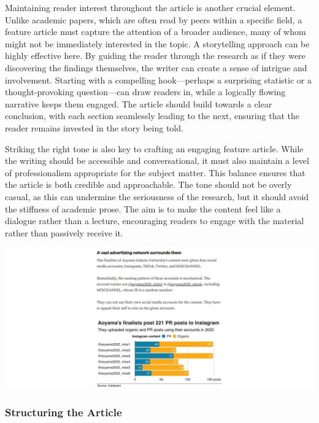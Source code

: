 \documentclass[
]{book}
\begin{document}
Maintaining reader interest throughout the article is another crucial element. Unlike academic papers, which are often read by peers within a specific field, a feature article must capture the attention of a broader audience, many of whom might not be immediately interested in the topic. A storytelling approach can be highly effective here. By guiding the reader through the research as if they were discovering the findings themselves, the writer can create a sense of intrigue and involvement. Starting with a compelling hook---perhaps a surprising statistic or a thought-provoking question---can draw readers in, while a logically flowing narrative keeps them engaged. The article should build towards a clear conclusion, with each section seamlessly leading to the next, ensuring that the reader remains invested in the story being told.

Striking the right tone is also key to crafting an engaging feature article. While the writing should be accessible and conversational, it must also maintain a level of professionalism appropriate for the subject matter. This balance ensures that the article is both credible and approachable. The tone should not be overly casual, as this can undermine the seriousness of the research, but it should avoid the stiffness of academic prose. The aim is to make the content feel like a dialogue rather than a lecture, encouraging readers to engage with the material rather than passively receive it.

\href{https://medium.com/@nishiyama.ry/data-analysis-problematic-and-exploitative-beauty-contests-in-japanese-universities-fe551d31fa66}{\includegraphics[width=1\linewidth,height=\textheight,keepaspectratio]{images/feature-article.png}}

\subsubsection*{Structuring the Article}\label{structuring-the-article}
\end{document}
